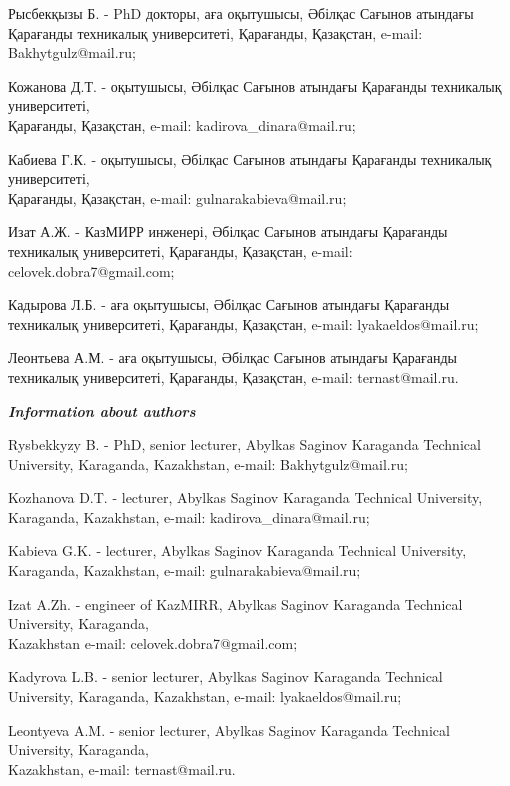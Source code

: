 \begin{noparindent}

Рысбекқызы Б. - PhD докторы, аға оқытушысы, Әбілқас Сағынов атындағы
Қарағанды техникалық университеті, Қарағанды, Қазақстан, e-mail:
Bakhytgulz@mail.ru;

Кожанова Д.Т. - оқытушысы, Әбілқас Сағынов атындағы Қарағанды техникалық
университеті,\\Қарағанды, Қазақстан, e-mail: kadirova\_dinara@mail.ru;

Кабиева Г.К. - оқытушысы, Әбілқас Сағынов атындағы Қарағанды техникалық
университеті,\\Қарағанды, Қазақстан, e-mail: gulnarakabieva@mail.ru;

Изат А.Ж. - КазМИРР инженері, Әбілқас Сағынов атындағы Қарағанды
техникалық университеті, Қарағанды, Қазақстан, e-mail:
celovek.dobra7@gmail.com;

Кадырова Л.Б. - аға оқытушысы, Әбілқас Сағынов атындағы Қарағанды
техникалық университеті, Қарағанды, Қазақстан, e-mail:
lyakaeldos@mail.ru;

Леонтьева А.М. - аға оқытушысы, Әбілқас Сағынов атындағы Қарағанды
техникалық университеті, Қарағанды, Қазақстан, e-mail: ternast@mail.ru.

\end{noparindent}

\emph{{\bfseries Information about authors}}
\begin{noparindent}

Rysbekkyzy B. - PhD, senior lecturer, Abylkas Saginov Karaganda
Technical University, Karaganda, Kazakhstan, e-mail: Bakhytgulz@mail.ru;

Kozhanova D.T. - lecturer, Abylkas Saginov Karaganda Technical
University, Karaganda, Kazakhstan, e-mail: kadirova\_dinara@mail.ru;

Kabieva G.K. - lecturer, Abylkas Saginov Karaganda Technical University,
Karaganda, Kazakhstan, e-mail: gulnarakabieva@mail.ru;

Izat A.Zh. - engineer of KazMIRR, Abylkas Saginov Karaganda Technical
University, Karaganda, \\Kazakhstan e-mail: celovek.dobra7@gmail.com;

Kadyrova L.B. - senior lecturer, Abylkas Saginov Karaganda Technical
University, Karaganda, Kazakhstan, e-mail: lyakaeldos@mail.ru;

Leontyeva A.M. - senior lecturer, Abylkas Saginov Karaganda Technical
University, Karaganda, \\Kazakhstan, e-mail: ternast@mail.ru.


\end{noparindent}


